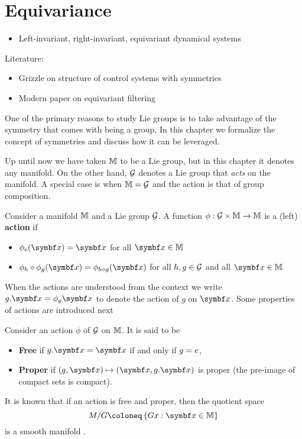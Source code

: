 
\chapter{Equivariance}


\begin{itemize}
  \item Left-invariant, right-invariant, equivariant dynamical systems
\end{itemize}

Literature:
\begin{itemize}
  \item Grizzle on structure of control systems with symmetries \cite{grizzle_structure_1985}
  \item Modern paper on equivariant filtering \cite{van_goor_equivariant_2020}
\end{itemize}

One of the primary reasons to study Lie groups is to take advantage of the symmetry that comes with being a group. In this chapter we formalize the concept of symmetries and discuss how it can be leveraged.

Up until now we have taken ${\mathbb{M}}$ to be a Lie group, but in this chapter it denotes any manifold. On the other hand, $\mathcal{G}$ denotes a Lie group that \emph{acts} on the manifold. A special case is when ${\mathbb{M}} = \mathcal{G}$ and the action is that of group composition.

\begin{definition}
  Consider a manifold ${\mathbb{M}}$ and a Lie group $\mathcal{G}$. A function $\phi : \mathcal{G} \times {\mathbb{M}} \rightarrow {\mathbb{M}}$ is a (left) \textbf{action} if
  \begin{itemize}
    \item $\phi_\id(\x) = \x$ for all $\x \in \M$
    \item $\phi_h \circ \phi_g (\x)= \phi_{h \circ g} (\x)$ for all $h, g \in \mathcal{G}$ and all $\x \in \M$
  \end{itemize}
\end{definition}
When the actions are understood from the context we write $g . \x = \phi_g \x$ to denote the action of $g$ on $\x$. Some properties of actions are introduced next
\begin{definition}
  Consider an action $\phi$ of $\mathcal{G}$ on ${\mathbb{M}}$. It is said to be
  \begin{itemize}
    \item \textbf{Free} if $g . \x = \x$ if and only if $g = e$,
    \item \textbf{Proper} if $(g, \x) \mapsto (\x, g.\x)$ is proper (the pre-image of compact sets is compact).
  \end{itemize}
\end{definition}
It is known that if an action is free and proper, then the quotient space
\begin{equation}
  M / G \coloneq \left\{ G x : \x \in \M \right\}
\end{equation}
is a smooth manifold \cite[Proposition 9.3.2]{marsden_introduction_1998}.

